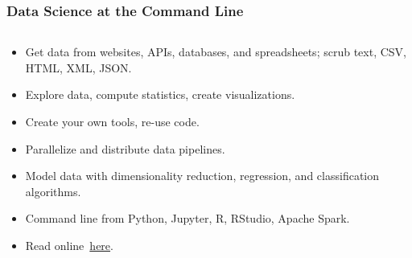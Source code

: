 \documentclass[aspectratio=169]{beamer}
\begin{document}
\begin{frame}
    \frametitle{Data Science at the Command Line\cite{janssens2021}}
    \begin{columns}
        \begin{column}{0.5\textwidth}
            \begin{itemize}
                \item Get data from websites, APIs, databases, and
                    spreadsheets; scrub text, CSV, HTML, XML, JSON.
                \item Explore data, compute statistics, create
                    visualizations.
                \item Create your own tools, re-use code.
                \item Parallelize and distribute data pipelines.
                \item Model data with dimensionality reduction, regression, and
                    classification algorithms.
                \item Command line from Python, Jupyter, R, RStudio, Apache
                    Spark.
                \item Read online~\href{https://jeroenjanssens.com/dsatcl}
                    {here}.
            \end{itemize}
        \end{column}
\end{columns}
\end{frame}
\end{document}
